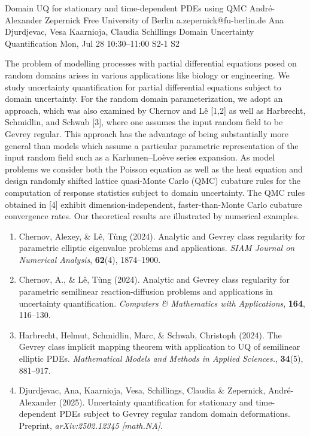 \begin{talk}
  {Domain UQ for stationary and time-dependent PDEs using QMC}%
  {Andr\'e-Alexander Zepernick}%
  {Free University of Berlin}%
  {a.zepernick@fu-berlin.de}%
  {Ana Djurdjevac, Vesa Kaarnioja, Claudia Schillings}%
  {Domain Uncertainty Quantification}%
  {Mon, Jul 28 10:30--11:00}%
  {S2-1}%
  {S2}%

The problem of modelling processes with partial differential equations posed on random domains arises in various applications like biology or engineering. We study uncertainty quantification for partial differential equations subject to domain uncertainty. For the random domain parameterization, we adopt an approach, which was also examined by Chernov and L\^{e} [1,2] as well as Harbrecht, Schmidlin, and Schwab [3], where one assumes the input random field to be Gevrey regular. This approach has the advantage of being substantially more general than models which assume a particular parametric representation of the input random field such as a Karhunen--Lo\`eve series expansion. As model problems we consider both the Poisson equation as well as the heat equation and design randomly shifted lattice quasi-Monte Carlo (QMC) cubature rules for the computation of response statistics subject to domain uncertainty. The QMC rules obtained in [4] exhibit dimension-independent, faster-than-Monte Carlo cubature convergence rates. Our theoretical results are illustrated by numerical examples.
\begin{enumerate}
    \item[{[1]}] Chernov, Alexey, \& L\^{e}, T\`ung (2024). Analytic and Gevrey class regularity for parametric elliptic eigenvalue problems and applications. \emph{SIAM Journal on Numerical Analysis}, \textbf{62}(4), 1874--1900.
    \item[{[2]}] Chernov, A., \& L\^{e}, T\`ung (2024). Analytic and Gevrey class regularity for parametric semilinear reaction-diffusion problems and applications in uncertainty quantification. \emph{Computers \& Mathematics with Applications}, \textbf{164}, 116--130.
    \item[{[3]}] Harbrecht, Helmut, Schmidlin, Marc, \& Schwab, Christoph (2024). The Gevrey class implicit mapping theorem with application to UQ of semilinear elliptic PDEs. \emph{Mathematical Models and Methods in Applied Sciences.}, \textbf{34}(5), 881--917.
    \item[{[4]}] Djurdjevac, Ana, Kaarnioja, Vesa, Schillings, Claudia \& Zepernick, Andr\'e-Alexander (2025). Uncertainty quantification for stationary and time-dependent PDEs subject to Gevrey regular random domain deformations. Preprint, \emph{arXiv:2502.12345 [math.NA]}.
\end{enumerate}

\medskip

\end{talk}

